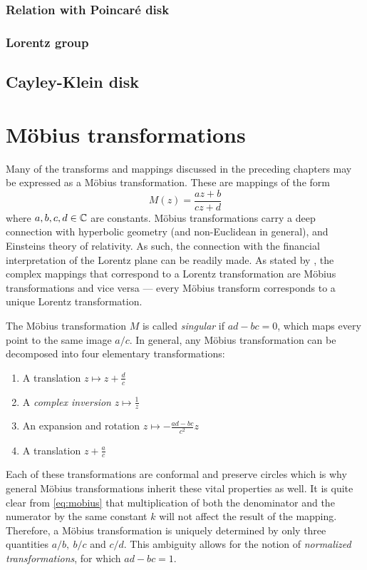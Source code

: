 \subsubsection{Relation with Poincaré disk}

\subsubsection{Lorentz group}

\subsection{Cayley-Klein disk}

\section{Möbius transformations}
\label{sec:mobius}
Many of the transforms and mappings discussed in the preceding chapters may be expressed as a Möbius transformation. These are mappings of the form \cite{Needham1997}
\begin{equation}
    M(z) = \frac{az + b}{cz + d}
    \label{eq:mobius}
\end{equation}
where \(a, b, c, d \in \mathbb{C} \) are constants. Möbius transformations carry a deep connection with hyperbolic geometry (and non-Euclidean in general), and Einsteins theory of relativity. As such, the connection with the financial interpretation of the Lorentz plane can be readily made. As stated by \citet{Needham1997}, the complex mappings that correspond to a Lorentz transformation are Möbius transformations and vice versa --- every Möbius transform corresponds to a unique Lorentz transformation.

The Möbius transformation \(M\) is called \emph{singular} if \(ad - bc = 0\), which maps every point to the same image \(a/c\). In general, any Möbius transformation can be decomposed into four elementary transformations:
\begin{enumerate}
    \item A translation \(z \mapsto z + \frac{d}{c}\)
    \item A \emph{complex inversion} \(z \mapsto \frac{1}{z}\)
    \item An expansion and rotation \(z \mapsto -\frac{ad - bc}{c^2}z\)
    \item A translation \(z + \frac{a}{c}\)
\end{enumerate}
Each of these transformations are conformal and preserve circles which is why general Möbius transformations inherit these vital properties as well. It is quite clear from \cref{eq:mobius} that multiplication of both the denominator and the numerator by the same constant \(k\) will not affect the result of the mapping. Therefore, a Möbius transformation is uniquely determined by only three quantities \(a/b,\ b/c\) and \(c/d\). This ambiguity allows for the notion of \emph{normalized transformations}, for which \(ad - bc = 1\). 

